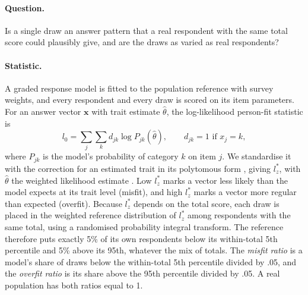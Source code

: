 \paragraph{Question.}
Is a single draw an answer pattern that a real respondent with the same total score could plausibly give, and are the draws as varied as real respondents?

\paragraph{Statistic.}
A graded response model \citep{samejima1969graded} is fitted to the population reference with survey weights, and every respondent and every draw is scored on its item parameters.
For an answer vector $\mathbf{x}$ with trait estimate $\hat\theta$, the log-likelihood person-fit statistic \citep{drasgow1985appropriateness} is
\begin{equation}
l_0 = \sum_{j} \sum_{k} d_{jk} \log P_{jk}(\hat\theta), \qquad d_{jk} = 1 \text{ if } x_j = k,
\end{equation}
where $P_{jk}$ is the model's probability of category $k$ on item $j$.
We standardise it with the correction for an estimated trait \citep{snijders2001personfit} in its polytomous form \citep{sinharay2016personfit}, giving $l_z^*$, with $\hat\theta$ the weighted likelihood estimate \citep{warm1989wle}.
Low $l_z^*$ marks a vector less likely than the model expects at its trait level (misfit), and high $l_z^*$ marks a vector more regular than expected (overfit).
Because $l_z^*$ depends on the total score, each draw is placed in the weighted reference distribution of $l_z^*$ among respondents with the same total, using a randomised probability integral transform.
The reference therefore puts exactly 5\% of its own respondents below its within-total 5th percentile and 5\% above its 95th, whatever the mix of totals.
The \emph{misfit ratio} is a model's share of draws below the within-total 5th percentile divided by .05, and the \emph{overfit ratio} is its share above the 95th percentile divided by .05.
A real population has both ratios equal to 1.

